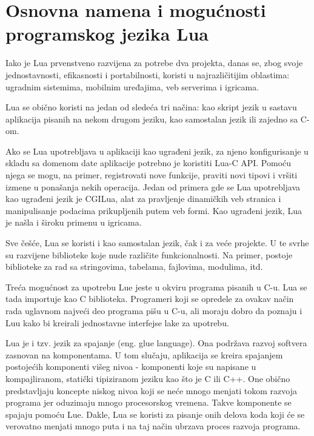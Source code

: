 \documentclass[a4paper]{article}
\begin{document}
\section{Osnovna namena i mogućnosti programskog jezika Lua}	
\label{sec:namena_i_mogucnosti}

Iako je Lua prvenstveno razvijena za potrebe dva projekta, danas se, zbog svoje jednostavnosti, efikasnosti i portabilnosti, koristi u najrazličitijim oblastima: ugradnim sistemima, mobilnim uređajima, veb serverima i igricama.

Lua se obično koristi na jedan od sledeća tri načina: kao skript jezik u sastavu aplikacija pisanih na nekom drugom jeziku, kao samostalan jezik ili zajedno sa C-om.\cite{bookProgInLua} 

Ako se Lua upotrebljava u aplikaciji kao ugrađeni jezik, za njeno konfigurisanje u skladu sa domenom date aplikacije potrebno je koristiti Lua-C API. Pomoću njega se mogu, na primer, registrovati nove funkcije, praviti novi tipovi i vršiti izmene u ponašanja nekih operacija. Jedan od primera gde se Lua upotrebljava kao ugrađeni jezik je CGILua, alat za pravljenje dinamičkih veb stranica i manipulisanje podacima prikupljenih putem veb formi. Kao ugrađeni jezik, Lua je našla i široku primenu u igricama.

Sve češće, Lua se koristi i kao samostalan jezik, čak i za veće projekte. U te svrhe su razvijene biblioteke koje nude različite funkcionalnosti. Na primer, postoje biblioteke za rad sa stringovima, tabelama, fajlovima, modulima, itd.

Treća mogućnost za upotrebu Lue jeste u okviru programa pisanih u C-u. Lua se tada importuje kao C biblioteka. Programeri koji se opredele za ovakav način rada uglavnom najveći deo programa pišu u C-u, ali moraju dobro da poznaju i Luu kako bi kreirali jednostavne interfejse lake za upotrebu.

Lua je i tzv. jezik za spajanje (eng. glue language). Ona podržava razvoj softvera zasnovan na komponentama. U tom slučaju, aplikacija se kreira spajanjem postojećih komponenti višeg nivoa - komponenti koje su napisane u kompajliranom, statički tipiziranom jeziku kao što je C ili C++. One obično predstavljaju koncepte niskog nivoa koji se neće mnogo menjati tokom razvoja programa jer oduzimaju mnogo procesorskog vremena. Takve komponente se spajaju pomoću Lue. Dakle, Lua se koristi za pisanje onih delova koda koji će se verovatno menjati mnogo puta i na taj način ubrzava proces razvoja programa.
\end{document}
